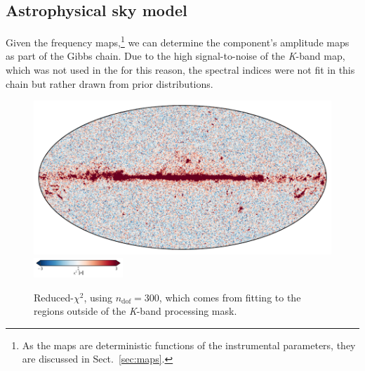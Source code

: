 \documentclass[twocolumn]{../../common/aa}
\def\WMAP{\emph{WMAP}}
\def\Planck{\emph{Planck}}
\newcommand{\K}[0]{\textit K}
\newcommand{\Ka}[0]{\textit{Ka}}
\begin{document}






\subsection{Astrophysical sky model}
\label{sec:skymodel}

Given the frequency maps,\footnote{As the maps are deterministic functions of the instrumental parameters, they are discussed in Sect.~\ref{sec:maps}.} we can determine the component's amplitude maps as part of the Gibbs chain. Due to the high signal-to-noise of the \K-band map, which was not used in the \citet{bp01} for this reason, the spectral indices were not fit in this chain but rather drawn from prior distributions.



\begin{figure}
	\centering
	\includegraphics[width=\linewidth]{figures/chisq_IQU.pdf}
	\newline
	\includegraphics[width=0.3\textwidth]{figures/cbar_3sigma.pdf}
	\caption{Reduced-$\chi^2$, using $n_\mathrm{dof}=300$, which comes from fitting to the regions outside of the \K-band processing mask.}
\end{figure}
\end{document}
